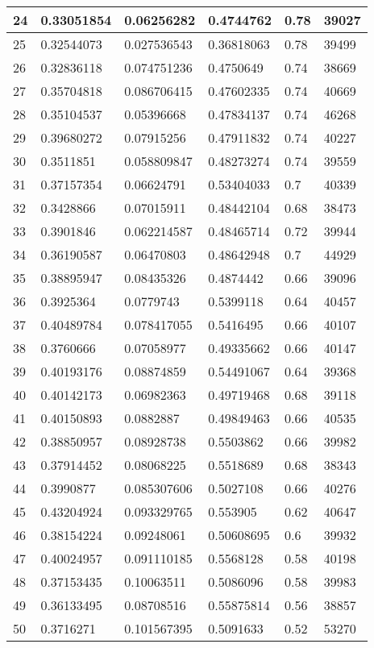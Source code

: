 \begin{longtable}{|l|l|l|l|l|l|}
24 & 0.33051854 & 0.06256282 & 0.4744762 & 0.78 & 39027 \\ \hline 
25 & 0.32544073 & 0.027536543 & 0.36818063 & 0.78 & 39499 \\ \hline 
26 & 0.32836118 & 0.074751236 & 0.4750649 & 0.74 & 38669 \\ \hline 
27 & 0.35704818 & 0.086706415 & 0.47602335 & 0.74 & 40669 \\ \hline 
28 & 0.35104537 & 0.05396668 & 0.47834137 & 0.74 & 46268 \\ \hline 
29 & 0.39680272 & 0.07915256 & 0.47911832 & 0.74 & 40227 \\ \hline 
30 & 0.3511851 & 0.058809847 & 0.48273274 & 0.74 & 39559 \\ \hline 
31 & 0.37157354 & 0.06624791 & 0.53404033 & 0.7 & 40339 \\ \hline 
32 & 0.3428866 & 0.07015911 & 0.48442104 & 0.68 & 38473 \\ \hline 
33 & 0.3901846 & 0.062214587 & 0.48465714 & 0.72 & 39944 \\ \hline 
34 & 0.36190587 & 0.06470803 & 0.48642948 & 0.7 & 44929 \\ \hline 
35 & 0.38895947 & 0.08435326 & 0.4874442 & 0.66 & 39096 \\ \hline 
36 & 0.3925364 & 0.0779743 & 0.5399118 & 0.64 & 40457 \\ \hline 
37 & 0.40489784 & 0.078417055 & 0.5416495 & 0.66 & 40107 \\ \hline 
38 & 0.3760666 & 0.07058977 & 0.49335662 & 0.66 & 40147 \\ \hline 
39 & 0.40193176 & 0.08874859 & 0.54491067 & 0.64 & 39368 \\ \hline 
40 & 0.40142173 & 0.06982363 & 0.49719468 & 0.68 & 39118 \\ \hline 
41 & 0.40150893 & 0.0882887 & 0.49849463 & 0.66 & 40535 \\ \hline 
42 & 0.38850957 & 0.08928738 & 0.5503862 & 0.66 & 39982 \\ \hline 
43 & 0.37914452 & 0.08068225 & 0.5518689 & 0.68 & 38343 \\ \hline 
44 & 0.3990877 & 0.085307606 & 0.5027108 & 0.66 & 40276 \\ \hline 
45 & 0.43204924 & 0.093329765 & 0.553905 & 0.62 & 40647 \\ \hline 
46 & 0.38154224 & 0.09248061 & 0.50608695 & 0.6 & 39932 \\ \hline 
47 & 0.40024957 & 0.091110185 & 0.5568128 & 0.58 & 40198 \\ \hline 
48 & 0.37153435 & 0.10063511 & 0.5086096 & 0.58 & 39983 \\ \hline 
49 & 0.36133495 & 0.08708516 & 0.55875814 & 0.56 & 38857 \\ \hline 
50 & 0.3716271 & 0.101567395 & 0.5091633 & 0.52 & 53270 \\ \hline 
\end{longtable}